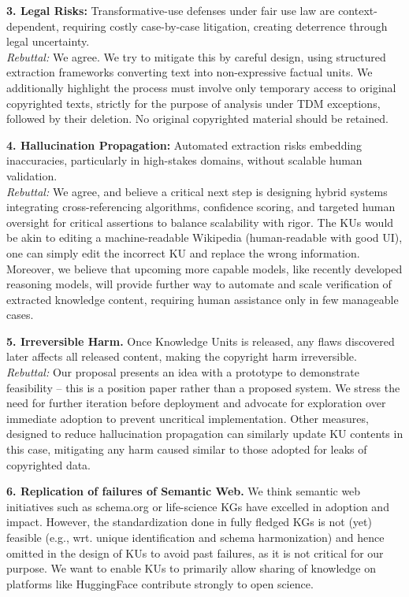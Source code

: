 \textbf{3. Legal Risks:} Transformative-use defenses under fair use law are context-dependent, requiring costly case-by-case litigation, creating deterrence through legal uncertainty.\\
\textit{Rebuttal:} We agree. We try to mitigate this by careful design, using structured extraction frameworks converting text into non-expressive factual units. We additionally highlight the process must involve only temporary access to original copyrighted texts, strictly for the purpose of analysis under TDM exceptions, followed by their deletion. No original copyrighted material should be retained. 

\textbf{4. Hallucination Propagation:}  Automated extraction risks embedding inaccuracies, particularly in high-stakes domains, without scalable human validation.\\
\textit{Rebuttal:} We agree, and believe a critical next step is designing hybrid systems integrating cross-referencing algorithms, confidence scoring, and targeted human oversight for critical assertions to balance scalability with rigor. The KUs would be akin to editing a machine-readable Wikipedia (human-readable with good UI), one can simply edit the incorrect KU and replace the wrong information. Moreover, we believe that upcoming more capable models, like recently developed reasoning models, will provide further way to automate and scale verification of extracted knowledge content, requiring human assistance only in few manageable cases.

\textbf{5. Irreversible Harm.} Once Knowledge Units is released, any flaws discovered later affects all released content, making the copyright harm irreversible.\\
\textit{Rebuttal:} Our proposal presents an idea with a prototype to demonstrate feasibility -- this is a position paper rather than a proposed system. We stress the need for further iteration before deployment and advocate for exploration over immediate adoption to prevent uncritical implementation. Other measures, designed to reduce hallucination propagation can similarly update KU contents in this case, mitigating any harm caused similar to those adopted for leaks of copyrighted data.

\textbf{6. Replication of failures of Semantic Web.} We think semantic web initiatives such as schema.org or life-science KGs have excelled in adoption and impact. However, the standardization done in fully fledged KGs is not (yet) feasible (e.g., wrt. unique identification and schema harmonization) and hence omitted in the design of KUs to avoid past failures, as it is not critical for our purpose. We want to enable KUs to primarily allow sharing of knowledge on platforms like HuggingFace contribute strongly to open science.